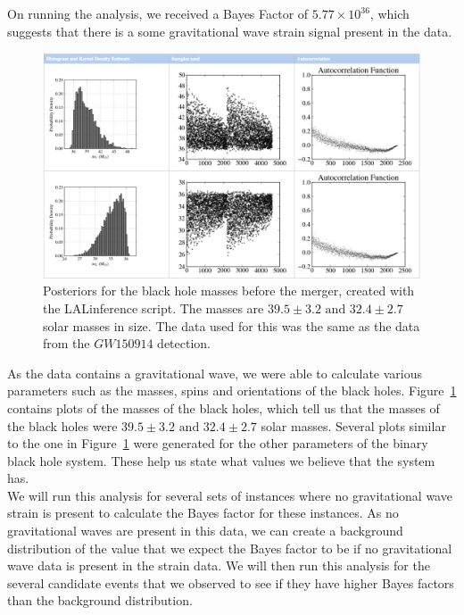\documentclass{article}
\begin{document}
 
  On running the analysis, we received a Bayes Factor of $5.77\times 10^{36}$, which suggests that there is a some gravitational wave strain signal present in the data.\\
 
      \begin{figure}[h]
      	\centering
      	\includegraphics[width=1\textwidth]{Figures/LALinferenceMasses.png} 
      	\caption{Posteriors for the black hole masses before the merger, created with the LALinference script. The masses are $39.5\pm3.2 \text{ and } 32.4\pm2.7$ solar masses in size. The data used for this was the same as the data from the $GW150914$ detection.}
      	\label{Fig:LALinferenceMasses}
      \end{figure}
      
      
 As the data contains a gravitational wave, we were able to calculate various parameters such as the masses, spins and orientations of the black holes. Figure~\ref{Fig:LALinferenceMasses} contains plots of the masses of the black holes, which tell us that the masses of the black holes were $39.5\pm3.2 \text{ and } 32.4\pm2.7$ solar masses. Several plots similar to the one in Figure~\ref{Fig:LALinferenceMasses} were generated for the other parameters of the binary black hole system. These help us state what values we believe that the system has. \\
 
 We will run this analysis for several sets of instances where no gravitational wave strain is present to calculate the Bayes factor for these instances. As no gravitational waves are present in this data, we can create a background distribution of the value that we expect the Bayes factor to be if no gravitational wave data is present in the strain data. We will then run this analysis for the several candidate events that we observed to see if they have higher Bayes factors than the background distribution. 
 
\end{document}
